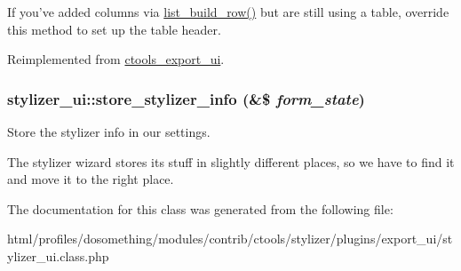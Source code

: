 If you've added columns via \hyperlink{classstylizer__ui_a37d2a02c59128507bb6e811b97de3f06}{list\_\-build\_\-row()} but are still using a table, override this method to set up the table header. 

Reimplemented from \hyperlink{classctools__export__ui_a01b1219535377db871132934f806b8a0}{ctools\_\-export\_\-ui}.\hypertarget{classstylizer__ui_a3d7f33c9c85488dc569f74f01594fe02}{
\subsubsection[{store\_\-stylizer\_\-info}]{\setlength{\rightskip}{0pt plus 5cm}stylizer\_\-ui::store\_\-stylizer\_\-info (\&\$ {\em form\_\-state})}}
\label{classstylizer__ui_a3d7f33c9c85488dc569f74f01594fe02}
Store the stylizer info in our settings.

The stylizer wizard stores its stuff in slightly different places, so we have to find it and move it to the right place. 

The documentation for this class was generated from the following file:\begin{DoxyCompactItemize}
\item 
html/profiles/dosomething/modules/contrib/ctools/stylizer/plugins/export\_\-ui/stylizer\_\-ui.class.php\end{DoxyCompactItemize}
